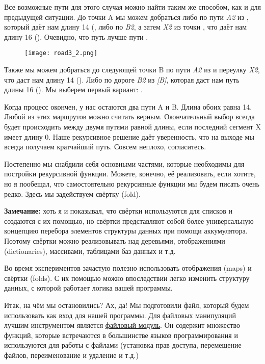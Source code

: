 Все возможные пути для этого случая можно найти таким же способом, как и для предыдущей ситуации.
До точки A мы можем добраться либо по пути \emph{A2} из \ops{[B, X]}, который даёт нам длину 14 (, либо по \emph{B2}, а затем \emph{X2} из точки \ops{[B]}, что даёт нам длину 16 ().
Очевидно, что путь \ops{[B, X, A]} лучше пути \ops{[B, B, X]}.
\begin{figure}[h!]
    \texttt{[image: road3\_2.png]}
\end{figure}

Также мы можем добраться до следующей точки B по пути \emph{A2} из \ops{[B, X]} и переулку \emph{X2}, что даст нам длину 14 ().
Либо по дороге \emph{B2} из \emph{[B]}, которая даст нам путь длины 16 ().
Мы выберем первый вариант: \ops{[B, X, A, X]}.

Когда процесс окончен, у нас остаются два пути A и B.
Длина обоих равна 14.
Любой из этих маршрутов можно считать верным.
Окончательный  выбор всегда будет происходить между двумя путями равной длины, если последний сегмент X имеет длину 0.
Наше рекурсивное решение даёт уверенность, что на выходе мы всегда получаем кратчайший путь.
Совсем неплохо, согласитесь.

Постепенно мы снабдили себя основными частями, которые необходимы для постройки рекурсивной функции.
Можете, конечно, её реализовать, если хотите, но я пообещал, что самостоятельно рекурсивные функции мы будем писать очень редко.
Здесь мы задействуем свёртку (fold).\\
\colorbox{lgray}
{
\begin{minipage}{1.0\linewidth}
    \textbf{Замечание:} хоть я и показывал, что свёртки используются для списков и создаются с их помощью, но свёртки представляют собой более универсальную концепцию перебора элементов структуры данных при помощи аккумулятора.
Поэтому свёртки можно реализовывать над деревьями, отображениями (dictionaries), массивами, таблицами баз данных и т.д.

Во время экспериментов зачастую полезно использовать отображения (maps) и свёртки (folds).
С их помощью можно впоследствии легко изменить структуру данных, с которой работает логика вашей программы.
\end{minipage}
}

Итак, на чём мы остановились?
Ах, да!
Мы подготовили файл, который будем использовать как вход для нашей программы.
Для файловых манипуляций лучшим инструментом является \href{http://erldocs.com/R15B/kernel/file.html}{файловый модуль}.
Он содержит множество функций, которые встречаются в большинстве языков программирования и используются для работы с файлами (установка прав доступа, перемещение файлов, переименование и удаление и т.д.)

